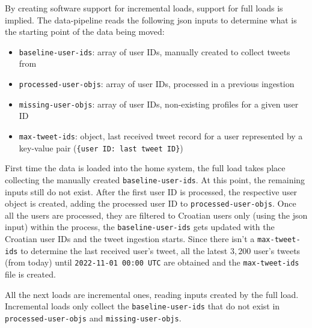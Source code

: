 \clearpage

By creating software support for incremental loads, support for full loads is implied. The \gls{data-pipeline} reads the following \acrshort{json} inputs to determine what is the starting point of the data being moved:

\begin{itemize}
    \item \texttt{baseline-user-ids}: array of user IDs, manually created to collect tweets from
    \item \texttt{processed-user-objs}: array of user IDs, processed in a previous ingestion
    \item \texttt{missing-user-objs}: array of user IDs, non-existing profiles for a given user ID
    \item \texttt{max-tweet-ids}: object, last received tweet record for a user represented by a key-value pair (\texttt{\{user ID: last tweet ID\}})
    \vspace{0.6cm}
\end{itemize}


First time the data is loaded into the home system, the full load takes place collecting the manually created \texttt{baseline-user-ids}. At this point, the remaining inputs still do not exist. After the first user ID is processed, the respective user object is created, adding the processed user ID to \texttt{processed-user-objs}. Once all the users are processed, they are filtered to Croatian users only (using the  \acrshort{json} input) within the  process, the \texttt{baseline-user-ids} gets updated with the Croatian user IDs and the tweet ingestion starts. Since there isn't a \texttt{max-tweet-ids} to determine the last received user's tweet, all the latest \(3,200\) user's tweets (from today) until \texttt{2022-11-01 00:00 UTC} are obtained and the \texttt{max-tweet-ids} file is created.

All the next loads are incremental ones, reading inputs created by the full load. Incremental loads only collect the \texttt{baseline-user-ids} that do not exist in \texttt{processed-user-objs} and \texttt{missing-user-objs}.
